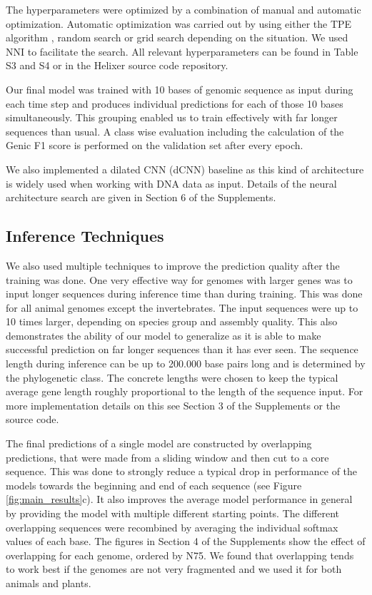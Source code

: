 \documentclass{bioinfo}
\begin{document}
\begin{methods}
The hyperparameters were optimized by a combination of manual and automatic optimization. Automatic optimization was carried out by using either the TPE algorithm \citep{bergstra2011algorithms}, random search or grid search depending on the situation. We used NNI \citep{nni2019} to facilitate the search. All relevant hyperparameters can be found in Table S3 and S4 or in the Helixer source code repository. 
	
Our final model was trained with 10 bases of genomic sequence as input during each time step and produces individual predictions for each of those 10 bases simultaneously. This grouping enabled us to train effectively with far longer sequences than usual. A class wise evaluation including the calculation of the Genic F1 score is performed on the validation set after every epoch.

We also implemented a dilated CNN (dCNN) baseline as this kind of architecture is widely used when working with DNA data as input. Details of the neural architecture search are given in Section 6 of the Supplements.

\subsection{Inference Techniques}
We also used multiple techniques to improve the prediction quality after the training was done. One very effective way for genomes with larger genes was to input longer sequences during inference time than during training. This was done for all animal genomes except the invertebrates. The input sequences were up to 10 times larger, depending on species group and assembly quality. This also demonstrates the ability of our model to generalize as it is able to make successful prediction on far longer sequences than it has ever seen. The sequence length during inference can be up to 200.000 base pairs long and is determined by the phylogenetic class. The concrete lengths were chosen to keep the typical average gene length roughly proportional to the length of the sequence input. For more implementation details on this see Section 3 of the Supplements or the source code.
	
The final predictions of a single model are constructed by overlapping predictions, that were made from a sliding window and then cut to a core sequence. This was done to strongly reduce a typical drop in performance of the models towards the beginning and end of each sequence (see Figure \ref{fig:main_results}c). It also improves the average model performance in general by providing the model with multiple different starting points. The different overlapping sequences were recombined by averaging the individual softmax values of each base. The figures in Section 4 of the Supplements show the effect of overlapping for each genome, ordered by N75. We found that overlapping tends to work best if the genomes are not very fragmented and we used it for both animals and plants.


\end{methods}
\end{document}
